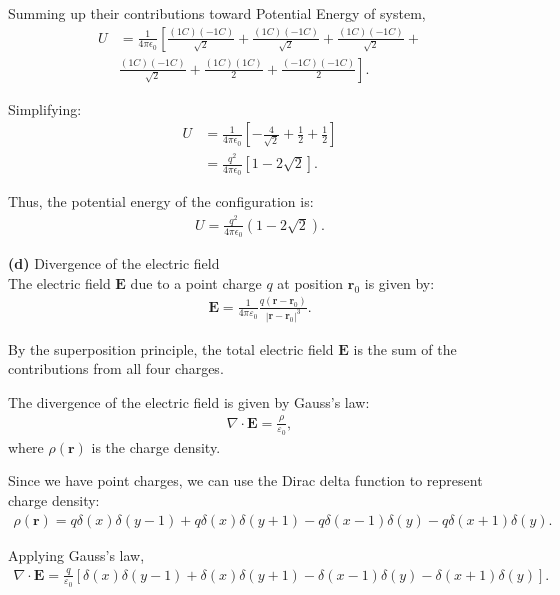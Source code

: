 \documentclass{article}
\begin{document}
Summing up their contributions toward Potential Energy of system,
\begin{align*}
    U &= \frac{1}{4\pi\epsilon_0} \left[ \frac{(1C)(-1C)}{\sqrt{2}} + \frac{(1C)(-1C)}{\sqrt{2}} + \frac{(1C)(-1C)}{\sqrt{2}} + \right. \\ 
    &\left. \frac{(1C)(-1C)}{\sqrt{2}} + \frac{(1C)(1C)}{2} + \frac{(-1C)(-1C)}{2} \right].
\end{align*}

Simplifying:
\begin{align*}
    U &= \frac{1}{4\pi\epsilon_0} \left[ -\frac{4}{\sqrt{2}} + \frac{1}{2} + \frac{1}{2} \right] \\
    &= \frac{q^2}{4\pi\epsilon_0} \left[ 1 - 2\sqrt{2} \right].
\end{align*}

Thus, the potential energy of the configuration is:
\begin{align*}
U = \frac{q^2}{4\pi\epsilon_0} (1 - 2\sqrt{2}).
\end{align*}

\textbf{(d)} Divergence of the electric field\\
The electric field $\mathbf{E}$ due to a point charge $q$ at position $\mathbf{r}_0$ is given by:
\begin{align*}
    \mathbf{E} = \frac{1}{4\pi\varepsilon_0} \frac{q (\mathbf{r} - \mathbf{r}_0)}{|\mathbf{r} - \mathbf{r}_0|^3}.
\end{align*}

By the superposition principle, the total electric field $\mathbf{E}$ is the sum of the contributions from all four charges.

The divergence of the electric field is given by Gauss's law:
\begin{align*}
    \nabla \cdot \mathbf{E} = \frac{\rho}{\varepsilon_0},
\end{align*}
where $\rho(\mathbf{r})$ is the charge density.

Since we have point charges, we can use the Dirac delta function to represent charge density:
\begin{align*}
    \rho(\mathbf{r}) = q \delta(x)\delta(y - 1) + q \delta(x)\delta(y + 1) - q \delta(x - 1)\delta(y) - q \delta(x + 1)\delta(y).
\end{align*}

Applying Gauss's law,
\begin{align*}
    \nabla \cdot \mathbf{E} = \frac{q}{\varepsilon_0} \left[ \delta(x)\delta(y - 1) + \delta(x)\delta(y + 1) - \delta(x - 1)\delta(y) - \delta(x + 1)\delta(y) \right].
\end{align*}
\end{document}
